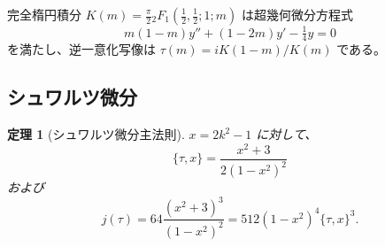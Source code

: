 \documentclass[12pt]{article}
\theoremstyle{plain}
\newtheorem{theorem}{定理}[section]
\theoremstyle{definition}
\numberwithin{equation}{section}
\begin{document}
完全楕円積分 $K(m)=\frac{\pi}{2}{}_2F_1(\frac{1}{2},\frac{1}{2};1;m)$ は超幾何微分方程式
\begin{equation}\label{eq:hypergeometric}
m(1-m)y'' + (1-2m)y' - \tfrac{1}{4}y = 0
\end{equation}
を満たし、逆一意化写像は $\tau(m)=iK(1-m)/K(m)$ である。

\subsection{シュワルツ微分}

\begin{theorem}[シュワルツ微分主法則]\label{thm:schwarzian}
$x=2k^2-1$ に対して、
\begin{equation}
\boxed{\{\tau,x\} = \frac{x^2+3}{2(1-x^2)^2}}
\end{equation}
および
\begin{equation}
\boxed{j(\tau) = 64\frac{(x^2+3)^3}{(1-x^2)^2} = 512(1-x^2)^4\{\tau,x\}^3.}
\end{equation}
\end{theorem}
\end{document}
